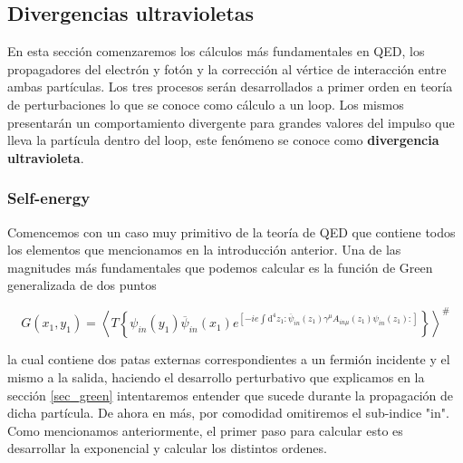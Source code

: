 \documentclass{article}
\numberwithin{equation}{section}
\begin{document}
\subsection{Divergencias ultravioletas}

En esta sección comenzaremos los cálculos más fundamentales en QED, los propagadores del electrón y fotón y la corrección al vértice de interacción entre ambas partículas. Los tres procesos serán desarrollados a primer orden en teoría de perturbaciones lo que se conoce como cálculo a un loop. Los mismos presentarán un comportamiento divergente para grandes valores del impulso que lleva la partícula dentro del loop, este fenómeno se conoce como \textbf{divergencia ultravioleta}. 

\subsubsection{Self-energy}

Comencemos con un caso muy primitivo de la teoría de QED que contiene todos los elementos que mencionamos en la introducción anterior. Una de las magnitudes más fundamentales que podemos calcular es la función de Green generalizada de dos puntos 

\begin{equation}\label{qedgreen}
G(x_{1},y_{1})=\left\langle T\left\{ \psi_{in}(y_{1})\overline{\psi}_{in}(x_{1})e^{\left[-ie\int \mathrm{\mathrm{d^4}}z_{1}:\overline{\psi}_{in}(z_{1})\gamma^{\mu}A_{ in \mu}(z_{1})\psi_{in}(z_{1}):\right]}\right\} \right\rangle ^{\#}
\end{equation}

la cual contiene dos patas externas correspondientes a un fermión incidente y el mismo a la salida, haciendo el desarrollo perturbativo que explicamos en la sección \ref{sec_green} intentaremos entender que sucede durante la propagación de dicha partícula. De ahora en más, por comodidad omitiremos el sub-indice "in".
Como mencionamos anteriormente,
el primer paso para calcular esto es desarrollar la exponencial y
calcular los distintos ordenes.\\
\end{document}
